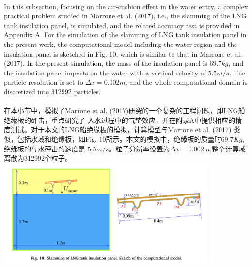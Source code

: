 \documentclass[UTF8]{ctexart}
\begin{document}
\paragraph{\quad}In this subsection, focusing on the air-cushion effect in the water entry, 
                a complex practical problem studied in Marrone et al. (2017), i.e., the slamming 
                of the LNG tank insulation panel, is simulated, and the related accuracy test is 
                provided in Appendix A. For the simulation of the slamming of LNG tank insulation 
                panel in the present work, the computational model including the water region and 
                the insulation panel is sketched in Fig. 10, which is similar to that in Marrone 
                et al. (2017). In the present simulation, the mass of the insulation panel is $69.7 kg$, 
                and the insulation panel impacts on the water with a vertical velocity of $5.5 m/s$. 
                The particle resolution is set to $\Delta x = 0.002m$, and the whole computational domain 
                is discretized into 312992 particles.
\paragraph{\quad}在本小节中，模拟了Marrone et al. (2017)研究的一个复杂的工程问题，即LNG船绝缘板的砰击，重点研究了
                入水过程中的气垫效应，并在附录A中提供相应的精度测试。对于本文的LNG船绝缘板的模拟，计算模型与Marrone et al. (2017)
                类似，包括水域和绝缘板，如Fig. 10所示。本文的模拟中，绝缘板的质量时$69.7Kg$,绝缘板的与水砰击的速度是
                $5.5m/s$。粒子分辨率设置为$\Delta x = 0.002m$,整个计算域离散为312992个粒子。\\
{
    \centering
    \includegraphics[width=30em]{./source/Fig10.png}
}
\end{document}
